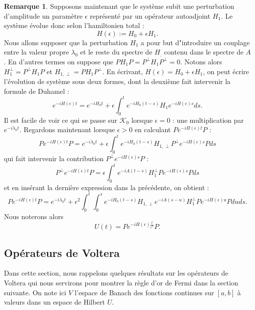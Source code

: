 \documentclass[12pt,openany,a4paper, titlepage]{article}
\newcommand{\f}[2]{\frac{#1}{#2}}
\newcommand{\St}[2]{e^{-i #1 #2}}
\newcommand{\ortho}{P^\perp}
\theoremstyle{definition}
\theoremstyle{definition}
\theoremstyle{definition}
\theoremstyle{definition}
\theoremstyle{definition}
\newtheorem{rem}{Remarque}
\theoremstyle{definition}
\begin{document}
\begin{rem}
Supposons maintenant que le système subit une perturbation d'amplitude un paramètre $\epsilon$ représenté par un opérateur autoadjoint $H_1$. Le système évolue donc selon l'hamiltonien total :
$$ H(\epsilon) := H_0 + \epsilon H_1.$$
Nous allons supposer que la perturbation $H_1$ a pour but d"introduire un couplage entre la valeur propre $\lambda_0$ et le reste du spectre de $H_.$ contenu dans le spectre de $A$. En d'autres termes on suppose que $PH_1P = \ortho H_1 \ortho = 0$. Notons alors $H_1^\perp = \ortho H_1 P$ et $H_{1,\perp} = P H_1 \ortho$.
En écrivant, $H(\epsilon) = H_0 + \epsilon H_1$, on peut écrire l'évolution de système sous deux formes, dont la deuxième fait intervenir la formule de Duhamel :
\begin{equation}
   \St{H(\epsilon)}{t} = \St{H_0}{t} + \epsilon\int_0^t \St{H_0}{(t-s)}H_1 e^{-iH(\epsilon)s}  ds. 
\end{equation}
Il est facile de voir ce qui se passe sur $\mathcal{K}_0$ lorsque $\epsilon = 0$ : une multiplication par $\St{\lambda_0}{t}$. Regardons maintenant lorsque $\epsilon > 0$ en calculant $P\St{H(\epsilon)}{t}P$ :
\begin{equation}
P\St{H(\epsilon)}{t}P = \St{\lambda_0}{t} + \epsilon\int_0^t \St{H_0}{(t-s)}H_{1,\perp} \ortho\St{H(\epsilon)}{s}P  ds
\end{equation}
qui fait intervenir la contribution $\ortho\St{H(\epsilon)}{s}P$ : 
\begin{equation}
    \ortho\St{H(\epsilon)}{t}P = \epsilon\int_0^t \St{A}{(t-s)}H_1^\perp P\St{H(\epsilon)}{s}P  ds
\end{equation}
et en insérant la dernière expression dans la précédente, on obtient :
\begin{equation}
    P\St{H(\epsilon)}{t}P = \St{\lambda_0}{t} + \epsilon^2\int_0^t\int_0^s \St{H_0}{(t-s)}H_{1,\perp} \St{A}{(s-u)}H_1^\perp P\St{H(\epsilon)}{u}P  duds.
\end{equation}
Nous noterons alors $$U(t) = P\St{H(\epsilon)}{\f{t}{\epsilon^2}}P.$$

\subsection{Opérateurs de Voltera}

Dans cette section, nous rappelons quelques résultats sur les opérateurs de Voltera qui nous servirons pour montrer la règle d'or de Fermi dans la section suivante. On note ici $V$ l'espace de Banach des fonctions continues sur $[a,b]$ à valeurs dans un espace de Hilbert $U$.


\end{rem}
\end{document}
